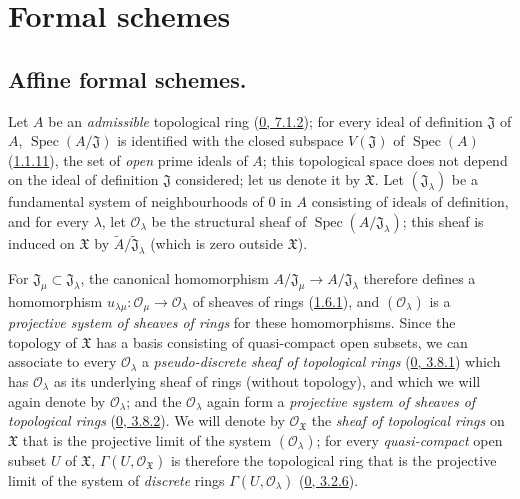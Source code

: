 \section{Formal schemes}
\label{section:I.10}

\subsection{Affine formal schemes.}
\label{subsection:I.10.1}

\begin{env}[10.1.1]
\label{I.10.1.1}
Let $A$ be an \emph{admissible} topological ring
(\hyperref[0.7.1.2]{0, 7.1.2}); for every ideal of definition
$\mathfrak{J}$ of $A$, $\operatorname{Spec}(A/\mathfrak{J})$ is identified
with the closed subspace $V(\mathfrak{J})$ of $\operatorname{Spec}(A)$
(\hyperref[I.1.1.11]{1.1.11}), the set of \emph{open} prime ideals
of $A$; this topological space does not depend on
the ideal of definition $\mathfrak{J}$ considered; let us denote it by
$\mathfrak{X}$. Let $(\mathfrak{J}_\lambda)$ be a fundamental system of
neighbourhoods of 0 in $A$ consisting of ideals of definition, and for every
$\lambda$, let $\mathscr{O}_\lambda$ be the structural sheaf of
$\operatorname{Spec}(A/\mathfrak{J}_\lambda)$; this sheaf is induced on
$\mathfrak{X}$ by
$\widetilde{A}/\widetilde{\mathfrak{J}}_\lambda$ (which is zero outside
$\mathfrak{X}$).

For $\mathfrak{J}_\mu\subset\mathfrak{J}_\lambda$, the canonical
homomorphism $A/\mathfrak{J}_\mu\to A/\mathfrak{J}_\lambda$ therefore
defines a homomorphism
$u_{\lambda\mu}:\mathscr{O}_\mu\to\mathscr{O}_\lambda$ of sheaves of
rings (\hyperref[I.1.6.1]{1.6.1}), and
$(\mathscr{O}_\lambda)$ is a \emph{projective system of sheaves of
rings} for these homomorphisms. Since the topology of $\mathfrak{X}$
has a basis consisting of quasi-compact open subsets, we can associate to
every $\mathscr{O}_\lambda$ a \emph{pseudo-discrete sheaf of topological
rings} (\hyperref[0.3.8.1]{0, 3.8.1}) which has
$\mathscr{O}_\lambda$ as its underlying sheaf of rings (without topology),
and which we will again denote by $\mathscr{O}_\lambda$; and the
$\mathscr{O}_\lambda$ again form a \emph{projective system of sheaves of
topological rings} (\hyperref[0.3.8.2]{0, 3.8.2}). We will denote
by $\mathscr{O}_{\mathfrak{X}}$ the \emph{sheaf of topological rings}
on $\mathfrak{X}$ that is the projective limit of the system
$(\mathscr{O}_\lambda)$; for every \emph{quasi-compact} open subset $U$ of
$\mathfrak{X}$, $\Gamma(U,\mathscr{O}_{\mathfrak{X}})$ is therefore the
topological ring that is the projective limit of the system of
\emph{discrete} rings $\Gamma(U,\mathscr{O}_\lambda)$
(\hyperref[0.3.2.6]{0, 3.2.6}).
\end{env}

